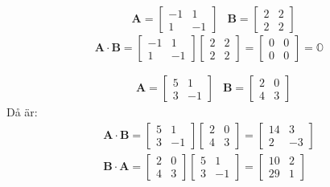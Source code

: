 \begin{Ex}
    \begin{align*}
    &\mathbf{A} = \begin{bmatrix} -1&1\\1&-1 \end{bmatrix} &\mathbf{B} = \begin{bmatrix} 2&2\\2&2 \end{bmatrix}
    \end{align*}
    \[
        \mathbf{A} \cdot \mathbf{B} = \begin{bmatrix} -1&1\\1&-1 \end{bmatrix}\begin{bmatrix} 2&2\\2&2 \end{bmatrix} = \begin{bmatrix} 0&0\\0&0 \end{bmatrix} = \mathbb{O}
    \]
\end{Ex}
\begin{Ex}
    \begin{align*}
    &\mathbf{A} = \begin{bmatrix} 5&1\\3&-1 \end{bmatrix} &\mathbf{B} = \begin{bmatrix} 2&0\\4&3 \end{bmatrix}
    \end{align*}
    Då är:
    \begin{gather*}
    	\mathbf{A} \cdot \mathbf{B} = \begin{bmatrix} 5&1\\3&-1 \end{bmatrix} \begin{bmatrix} 2&0\\4&3 \end{bmatrix} = \begin{bmatrix} 14&3\\2&-3 \end{bmatrix}\\
    	\mathbf{B} \cdot \mathbf{A} = \begin{bmatrix} 2&0\\4&3 \end{bmatrix} \begin{bmatrix} 5&1\\3&-1 \end{bmatrix} = \begin{bmatrix} 10&2\\29&1 \end{bmatrix}
    \end{gather*}
\end{Ex}

